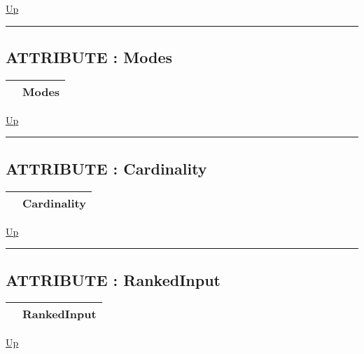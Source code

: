 \hyperlink{ecldoc:ml_core.fieldaggregates}{Up}

\par


\rule{\textwidth}{0.4pt}
\subsection*{ATTRIBUTE : Modes}
\hypertarget{ecldoc:ml_core.fieldaggregates.modes}{}

{\renewcommand{\arraystretch}{1.5}
\begin{tabularx}{\textwidth}{|>{\raggedright\arraybackslash}l|X|}
\hline
\hspace{0pt} & Modes \\
\hline
\end{tabularx}
}

\hyperlink{ecldoc:ml_core.fieldaggregates}{Up}

\par


\rule{\textwidth}{0.4pt}
\subsection*{ATTRIBUTE : Cardinality}
\hypertarget{ecldoc:ml_core.fieldaggregates.cardinality}{}

{\renewcommand{\arraystretch}{1.5}
\begin{tabularx}{\textwidth}{|>{\raggedright\arraybackslash}l|X|}
\hline
\hspace{0pt} & Cardinality \\
\hline
\end{tabularx}
}

\hyperlink{ecldoc:ml_core.fieldaggregates}{Up}

\par


\rule{\textwidth}{0.4pt}
\subsection*{ATTRIBUTE : RankedInput}
\hypertarget{ecldoc:ml_core.fieldaggregates.rankedinput}{}

{\renewcommand{\arraystretch}{1.5}
\begin{tabularx}{\textwidth}{|>{\raggedright\arraybackslash}l|X|}
\hline
\hspace{0pt} & RankedInput \\
\hline
\end{tabularx}
}

\hyperlink{ecldoc:ml_core.fieldaggregates}{Up}

